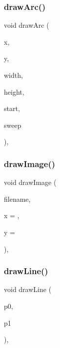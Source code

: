 \subsubsection{\texorpdfstring{draw\+Arc()}{drawArc()}}
{\footnotesize\ttfamily void draw\+Arc (\begin{DoxyParamCaption}\item[{double}]{x,  }\item[{double}]{y,  }\item[{double}]{width,  }\item[{double}]{height,  }\item[{double}]{start,  }\item[{double}]{sweep }\end{DoxyParamCaption})\hspace{0.3cm}{\ttfamily [virtual]}, {\ttfamily [inherited]}}

\mbox{\label{classGDrawingSurface_abdd4cb1f2c64adc5d03522a1ee30febf}} 
\subsubsection{\texorpdfstring{draw\+Image()}{drawImage()}}
{\footnotesize\ttfamily void draw\+Image (\begin{DoxyParamCaption}\item[{const std\+::string \&}]{filename,  }\item[{double}]{x = {},  }\item[{double}]{y = {} }\end{DoxyParamCaption})\hspace{0.3cm}{\ttfamily [virtual]}, {\ttfamily [inherited]}}

\mbox{\label{classGDrawingSurface_ae6a24b6b9a6e795d3165c1c750d5bdf1}} 
\subsubsection{\texorpdfstring{draw\+Line()}{drawLine()}\hspace{0.1cm}{\footnotesize\ttfamily [1/2]}}
{\footnotesize\ttfamily void draw\+Line (\begin{DoxyParamCaption}\item[{const \mbox{\hyperlink{classGPoint}{G\+Point}} \&}]{p0,  }\item[{const \mbox{\hyperlink{classGPoint}{G\+Point}} \&}]{p1 }\end{DoxyParamCaption})\hspace{0.3cm}{\ttfamily [virtual]}, {\ttfamily [inherited]}}

